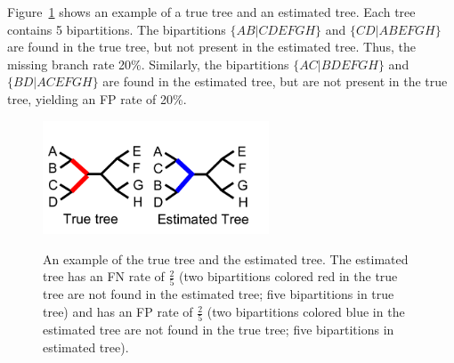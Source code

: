 



Figure~\ref{back:tree_error} shows an example of a true tree and an estimated tree.  Each tree contains 5 bipartitions.  The bipartitions $\{AB|CDEFGH\}$ and $\{CD|ABEFGH\}$ are found in the true tree, but not present in the estimated tree.  Thus, the missing branch rate 20\%.  Similarly, the bipartitions $\{AC|BDEFGH\}$ and $\{BD|ACEFGH\}$ are found in the estimated tree, but are not present in the true tree, yielding an FP rate of 20\%.


\begin{figure}[htbp]
\centering
{\includegraphics[width=0.60\textwidth]{background/unrooted_phylogeny_a}}
\caption[Computing error metrics of estimated tree.]{An example of the true tree and the estimated tree.  The estimated tree has an FN rate of $\frac{2}{5}$ (two bipartitions colored red in the true tree are not found in the estimated tree; five bipartitions in true tree) and has an FP rate of $\frac{2}{5}$ (two bipartitions colored blue in the estimated tree are not found in the true tree; five bipartitions in estimated tree).}  
\label{back:tree_error}
\end{figure}

